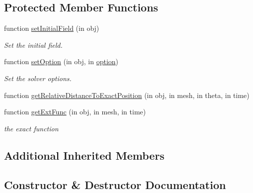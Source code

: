 \subsection*{Protected Member Functions}
\begin{DoxyCompactItemize}
\item 
function \hyperlink{class_adv_rotation_shock_uniform_mesh2d_a03c6dfa6f4786a8687f352814fedd376}{set\+Initial\+Field} (in obj)
\begin{DoxyCompactList}\small\item\em Set the initial field. \end{DoxyCompactList}\item 
function \hyperlink{class_adv_rotation_shock_uniform_mesh2d_ab61a5bc4dc4040f490a4257855d7fcb6}{set\+Option} (in obj, in \hyperlink{class_ndg_phys_af91f4c54b93504e76b38a5693774dff1}{option})
\begin{DoxyCompactList}\small\item\em Set the solver options. \end{DoxyCompactList}\item 
function \hyperlink{class_adv_rotation_shock_uniform_mesh2d_aa091f7ba3d25f02270e8367b0820c771}{get\+Relative\+Distance\+To\+Exact\+Position} (in obj, in mesh, in theta, in time)
\item 
function \hyperlink{class_adv_rotation_shock_uniform_mesh2d_af206b0ea7b6ccf8818cf247d7f765f30}{get\+Ext\+Func} (in obj, in mesh, in time)
\begin{DoxyCompactList}\small\item\em the exact function \end{DoxyCompactList}\end{DoxyCompactItemize}
\subsection*{Additional Inherited Members}


\subsection{Constructor \& Destructor Documentation}
\mbox{\label{class_adv_rotation_shock_uniform_mesh2d_a108369a47e494034da13c2bacd0059c1}} 
